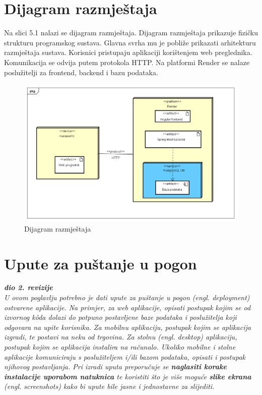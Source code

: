 			\eject 
		
		
		\section{Dijagram razmještaja}
			
			Na slici 5.1 nalazi se dijagram razmještaja. Dijagram razmještaja prikazuje fizičku strukturu programskog sustava. Glavna svrha mu je pobliže prikazati arhitekturu razmještaja sustava. Korisnici pristupaju aplikaciji korištenjem web preglednika. Komunikacija se odvija putem protokola HTTP. Na platformi Render se nalaze poslužitelji za frontend, backend i bazu podataka.
			
			\begin{figure}[H]
				\centering
				\includegraphics[width=\textwidth]{slike/Dijagram_razmjestaja.PNG}
				\caption{Dijagram razmještaja }
				\label{fig:dijagram_baze}
			\end{figure}
			
		\vspace{108pt}
		
		
		\section{Upute za puštanje u pogon}
		
			\textbf{\textit{dio 2. revizije}}\\
		
			 \textit{U ovom poglavlju potrebno je dati upute za puštanje u pogon (engl. deployment) ostvarene aplikacije. Na primjer, za web aplikacije, opisati postupak kojim se od izvornog kôda dolazi do potpuno postavljene baze podataka i poslužitelja koji odgovara na upite korisnika. Za mobilnu aplikaciju, postupak kojim se aplikacija izgradi, te postavi na neku od trgovina. Za stolnu (engl. desktop) aplikaciju, postupak kojim se aplikacija instalira na računalo. Ukoliko mobilne i stolne aplikacije komuniciraju s poslužiteljem i/ili bazom podataka, opisati i postupak njihovog postavljanja. Pri izradi uputa preporučuje se \textbf{naglasiti korake instalacije uporabom natuknica} te koristiti što je više moguće \textbf{slike ekrana} (engl. screenshots) kako bi upute bile jasne i jednostavne za slijediti.}
			
